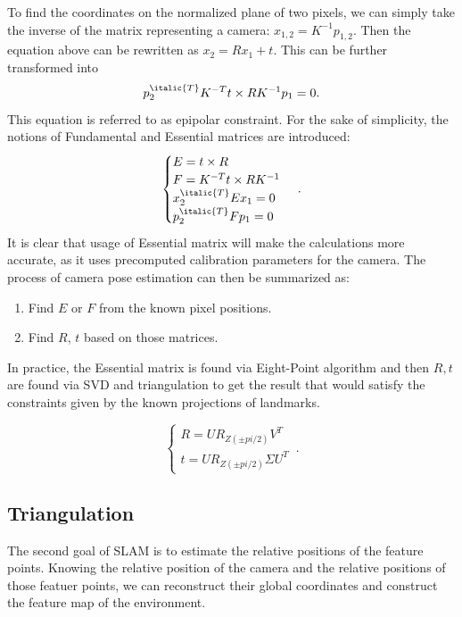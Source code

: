 To find the coordinates on the normalized plane of two pixels, we can simply take the inverse of the matrix representing a camera:
$x_{1, 2} = K^{-1}p_{1, 2}.$ Then the equation above can be rewritten as $x_{2} = Rx_{1} + t.$ This can be further transformed into $$p_{2}^{\italic{T}} K^{-T} t \times R K^{-1} p_{1} = 0.$$ This equation is referred to as epipolar constraint. For the sake of simplicity, the notions of Fundamental and Essential matrices are introduced:
\begin{equation}
    \begin{cases}
      E = t \times R\\
      F = K^{-T} t \times R K^{-1}\\
      x_{2}^{\italic{T}} E x_{1} = 0\\
      p_{2}^{\italic{T}} F p_{1} = 0
    \end{cases}\,.
\end{equation}
It is clear that usage of Essential matrix will make the calculations more accurate, as it uses precomputed calibration parameters for the camera. 
The process of camera pose estimation can then be summarized as:
\begin{enumerate}
    \item Find $E$ or $F$ from the known pixel positions.
    \item Find $R$, $t$ based on those matrices.
\end{enumerate}

In practice, the Essential matrix is found via Eight-Point algorithm and then $R, t$ are found via SVD and triangulation to get the result that would satisfy the constraints given by the known projections of landmarks.

\begin{equation}
    \begin{cases}
        R = U R_{Z(\pm pi/2)} V^{T}\\
        t = U R_{Z(\pm pi/2)} \Sigma U^{T}
    \end{cases}\,.
\end{equation}


\subsection{Triangulation}

The second goal of SLAM is to estimate the relative positions of the feature points. Knowing the relative position of the camera and the relative positions of those featuer points, we can reconstruct their global coordinates and construct the feature map of the environment. 

